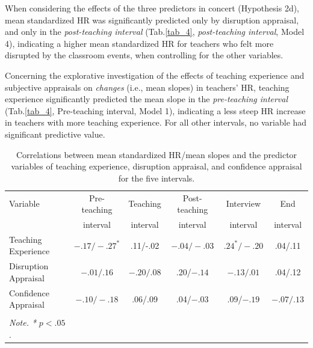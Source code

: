 \documentclass[preprint,
3p]{elsarticle} %
\begin{document}
When considering the effects of the three predictors in concert
(Hypothesis 2d), mean standardized HR was significantly predicted only
by disruption appraisal, and only in the \emph{post-teaching interval}
(Tab.\ref{tab_4}, \emph{post-teaching interval}, Model 4), indicating a
higher mean standardized HR for teachers who felt more disrupted by the
classroom events, when controlling for the other variables.

Concerning the explorative investigation of the effects of teaching
experience and subjective appraisals on \emph{changes} (i.e., mean
slopes) in teachers' HR, teaching experience significantly predicted the
mean slope in the \emph{pre-teaching interval} (Tab.\ref{tab_4},
Pre-teaching interval, Model 1), indicating a less steep HR increase in
teachers with more teaching experience. For all other intervals, no
variable had significant predictive value.

\renewcommand{\arraystretch}{1.5}

\begin{table}[h]
    \centering
    \begin{tabularx}{\textwidth}{lccccc}
        \toprule
        Variable & Pre-teaching & Teaching & Post-teaching & Interview & End \\
        & interval & interval & interval & interval & interval \\
        \midrule
        Teaching Experience & $- .17/ - .27^*$ & .11/-.02 & $- .04/-.03$ & $.24^*/-.20$ & .04/.11 \\
        Disruption Appraisal & $- .01/.16$ & $- .20/.08$ & .20/$- .14$ & $- .13/.01$ & .04/.12 \\
        Confidence Appraisal & $- .10/ - .18$ & .06/.09 & .04/$- .03$ & .09/$- .19$ & $- .07/.13$ \\
        \bottomrule \\
          \textit{Note. *} $p < .05$.
    \end{tabularx}
    \caption{Correlations between mean standardized HR/mean slopes and the predictor variables of teaching experience, disruption appraisal, and confidence appraisal for the five intervals.}
    \label{tab_3}
\end{table}

\newpage
\end{document}
